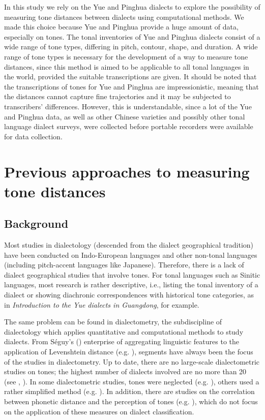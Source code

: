 \documentclass[output=paper, chinesefont]{langscibook}
\begin{document}
In this study we rely on the Yue and Pinghua dialects to explore the possibility of measuring tone distances between dialects using computational methods. We made this choice because Yue and Pinghua provide a huge amount of data, especially on tones. The tonal inventories of Yue and Pinghua dialects consist of a wide range of tone types, differing in pitch, contour, shape, and duration. A wide range of tone types is necessary for the development of a way to measure tone distances, since this method is aimed to be applicable to all tonal languages in the world, provided the suitable transcriptions are given. It should be noted that the transcriptions of tones for Yue and Pinghua are impressionistic, meaning that the distances cannot capture fine trajectories and it may be subjected to transcribers’ differences. However, this is understandable, since a lot of the Yue and Pinghua data, as well as other Chinese varieties and possibly other tonal language dialect surveys, were collected before portable recorders were available for data collection. 

\section{Previous approaches to measuring tone distances}
\label{sec:sung:3}
\subsection{Background}
\label{sec:sung:3.1}

\begin{sloppypar}
Most studies in dialectology (descended from the dialect geographical tradition) have been conducted on Indo-European languages and other non-tonal languages (including pitch-accent languages like Japanese). Therefore, there is a lack of dialect geographical studies that involve tones. For tonal languages such as Sinitic languages, most research is rather descriptive, i.e., listing the tonal inventory of a dialect or showing diachronic correspondences with historical tone categories, as in  \textit{Introduction to the Yue dialects in Guangdong}, for example.
\end{sloppypar}

The same problem can be found in dialectometry, the subdiscipline of dialectology which applies quantitative and computational methods to study dialects. From Séguy's (\citeyear{Seguy1971,Seguy1973}) enterprise of aggregating linguistic features to the application of Levenshtein distance (e.g. \citealt{Heeringa2004}), segments have always been the focus of the studies in dialectometry. Up to date, there are no large-scale dialectometric studies on tones; the highest number of dialects involved are no more than 20 (see \citealt{YangCastro2008}, \citealt{Tang2009}). In some dialectometric studies, tones were neglected (e.g. \citealt{WichmannRan2019}), others used a rather simplified method (e.g. \citealt{Stanford2012}). In addition, there are studies on the correlation between phonetic distance and the perception of tones (e.g. \citealt{YangCastro2008}), which do not focus on the application of these measures on dialect classification.
\end{document}
